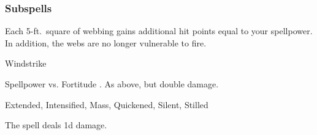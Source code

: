 \subsubsection{Subspells}
Each 5-ft.\ square of webbing gains additional hit points equal to your spellpower.
In addition, the webs are no longer vulnerable to fire.
\begin{spellsection}{Windstrike}
\begin{spellheader}
\end{spellheader}
\begin{spellcontent}
\begin{spelltargetinginfo}
\end{spelltargetinginfo}
\begin{spelleffects}
\begin{spellattack}{Spellpower vs. Fortitude}
\spellsuccess {}.
\spellcritical As above, but double damage.
\end{spellattack}
\end{spelleffects}
\end{spellcontent}
\begin{spellfooter}
 Extended, Intensified, Mass, Quickened, Silent, Stilled
\end{spellfooter}
\begin{spellsubcontent}
\begin{spellcantrip}
The spell deals \minus1d damage.
\end{spellcantrip}
\end{spellsubcontent}
\end{spellsection}
